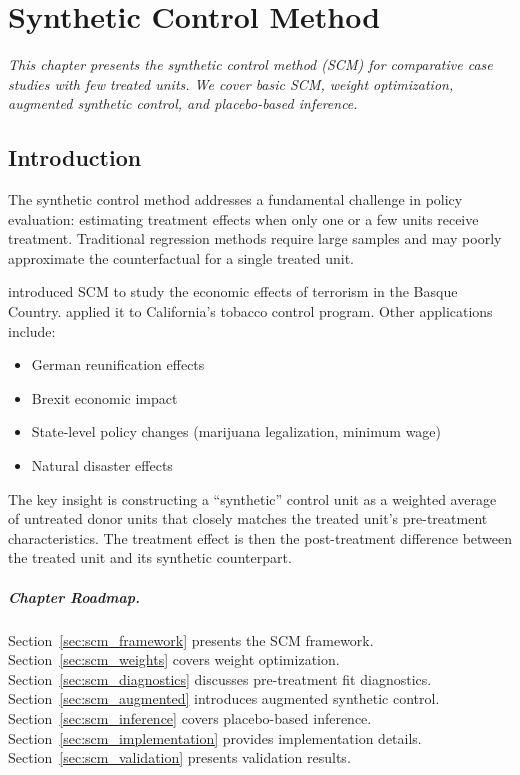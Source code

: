 
\chapter{Synthetic Control Method}
\label{ch:scm}

\emph{This chapter presents the synthetic control method (SCM) for comparative case studies with few treated units. We cover basic SCM, weight optimization, augmented synthetic control, and placebo-based inference.}

\section{Introduction}
\label{sec:scm_intro}

The synthetic control method addresses a fundamental challenge in policy evaluation: estimating treatment effects when only one or a few units receive treatment. Traditional regression methods require large samples and may poorly approximate the counterfactual for a single treated unit.

\begin{example}
\citet{abadie2003economic} introduced SCM to study the economic effects of terrorism in the Basque Country. \citet{abadie2010synthetic} applied it to California's tobacco control program. Other applications include:
\begin{itemize}
    \item German reunification effects \citep{abadie2015comparative}
    \item Brexit economic impact
    \item State-level policy changes (marijuana legalization, minimum wage)
    \item Natural disaster effects
\end{itemize}
\end{example}

The key insight is constructing a ``synthetic'' control unit as a weighted average of untreated donor units that closely matches the treated unit's pre-treatment characteristics. The treatment effect is then the post-treatment difference between the treated unit and its synthetic counterpart.

\paragraph{Chapter Roadmap.}
Section~\ref{sec:scm_framework} presents the SCM framework. Section~\ref{sec:scm_weights} covers weight optimization. Section~\ref{sec:scm_diagnostics} discusses pre-treatment fit diagnostics. Section~\ref{sec:scm_augmented} introduces augmented synthetic control. Section~\ref{sec:scm_inference} covers placebo-based inference. Section~\ref{sec:scm_implementation} provides implementation details. Section~\ref{sec:scm_validation} presents validation results.


